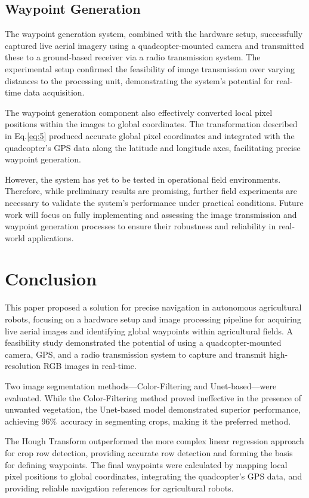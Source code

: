 \documentclass[conference]{IEEEtran}
\begin{document}
	\subsection{Waypoint Generation}
	
	The waypoint generation system, combined with the hardware setup, successfully captured live aerial imagery using a quadcopter-mounted camera and transmitted these to a ground-based receiver via a radio transmission system. The experimental setup confirmed the feasibility of image transmission over varying distances to the processing unit, demonstrating the system’s potential for real-time data acquisition.
	
	The waypoint generation component also effectively converted local pixel positions within the images to global coordinates. The transformation described in Eq.\ref{eq:5} produced accurate global pixel coordinates and integrated with the quadcopter’s GPS data along the latitude and longitude axes, facilitating precise waypoint generation.
	
	However, the system has yet to be tested in operational field environments. Therefore, while preliminary results are promising, further field experiments are necessary to validate the system’s performance under practical conditions. Future work will focus on fully implementing and assessing the image transmission and waypoint generation processes to ensure their robustness and reliability in real-world applications.
	
	
	\section{Conclusion}\label{Conclusion}
	This paper proposed a solution for precise navigation in autonomous agricultural robots, focusing on a hardware setup and image processing pipeline for acquiring live aerial images and identifying global waypoints within agricultural fields. A feasibility study demonstrated the potential of using a quadcopter-mounted camera, GPS, and a radio transmission system to capture and transmit high-resolution RGB images in real-time.
	
	Two image segmentation methods—Color-Filtering and Unet-based—were evaluated. While the Color-Filtering method proved ineffective in the presence of unwanted vegetation, the Unet-based model demonstrated superior performance, achieving 96\%\ accuracy in segmenting crops, making it the preferred method.
	
	The Hough Transform outperformed the more complex linear regression approach for crop row detection, providing accurate row detection and forming the basis for defining waypoints. The final waypoints were calculated by mapping local pixel positions to global coordinates, integrating the quadcopter's GPS data, and providing reliable navigation references for agricultural robots.
	
\end{document}
